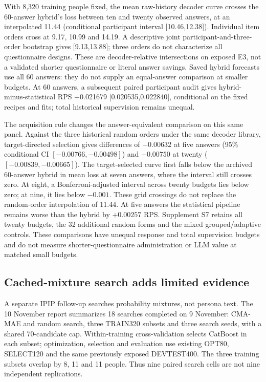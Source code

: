 \documentclass[11pt]{article}
\begin{document}
With 8,320 training people fixed, the mean raw-history decoder curve crosses the 60-answer hybrid's loss between ten and twenty observed answers, at an interpolated 11.44 (conditional participant interval [10.46,12.38]). Individual item orders cross at 9.17, 10.99 and 14.19. A descriptive joint participant-and-three-order bootstrap gives [9.13,13.88]; three orders do not characterize all questionnaire designs. These are decoder-relative intersections on exposed E3, not a validated shorter questionnaire or literal answer savings. Saved hybrid forecasts use all 60 answers: they do not supply an equal-answer comparison at smaller budgets. At 60 answers, a subsequent paired participant audit gives hybrid-minus-statistical RPS +0.021679 [0.020535,0.022840], conditional on the fixed recipes and fits; total historical supervision remains unequal.

The acquisition rule changes the answer-equivalent comparison on this same panel. Against the three historical random orders under the same decoder library, target-directed selection gives differences of $-0.00632$ at five answers (95\% conditional CI $[-0.00766,-0.00498]$) and $-0.00750$ at twenty ($[-0.00839,-0.00665]$). The target-selected curve first falls below the archived 60-answer hybrid in mean loss at seven answers, where the interval still crosses zero. At eight, a Bonferroni-adjusted interval across twenty budgets lies below zero; at nine, it lies below $-0.001$. These grid crossings do not replace the random-order interpolation of 11.44. At five answers the statistical pipeline remains worse than the hybrid by $+0.00257$ RPS. Supplement S7 retains all twenty budgets, the 32 additional random forms and the mixed grouped/adaptive controls. These comparisons have unequal response and total supervision budgets and do not measure shorter-questionnaire administration or LLM value at matched small budgets.

\subsection{Cached-mixture search adds limited evidence}\label{sec:cached}
A separate IPIP follow-up searches probability mixtures, not persona text.
The 10 November report summarizes 18 searches completed on 9 November:
CMA-MAE and random search, three TRAIN320 subsets and three search seeds,
with a shared 70-candidate cap. Within-training cross-validation selects
CatBoost in each subset; optimization, selection and evaluation use existing
OPT80, SELECT120 and the same previously exposed DEVTEST400. The three
training subsets overlap by 8, 11 and 11 people. Thus nine paired search
cells are not nine independent replications.
\end{document}
